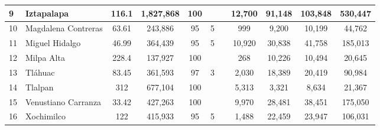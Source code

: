\begin{landscape}
\begin{table}[]
{\begin{tabular}{llcccllcccc}
\multicolumn{1}{|l|}{9} & \multicolumn{1}{l|}{Iztapalapa} & \multicolumn{1}{c|}{116.1} & \multicolumn{1}{c|}{1,827,868} & \multicolumn{1}{c|}{100} & \multicolumn{1}{l|}{} & \multicolumn{1}{l|}{} & \multicolumn{1}{c|}{12,700} & \multicolumn{1}{c|}{91,148} & \multicolumn{1}{c|}{103,848} & \multicolumn{1}{c|}{530,447} \\ \hline
\multicolumn{1}{|l|}{10} & \multicolumn{1}{l|}{Magdalena Contreras} & \multicolumn{1}{c|}{63.61} & \multicolumn{1}{c|}{243,886} & \multicolumn{1}{c|}{95} & \multicolumn{1}{c|}{5} & \multicolumn{1}{l|}{} & \multicolumn{1}{c|}{999} & \multicolumn{1}{c|}{9,200} & \multicolumn{1}{c|}{10,199} & \multicolumn{1}{c|}{44,762} \\ \hline
\multicolumn{1}{|l|}{11} & \multicolumn{1}{l|}{Miguel Hidalgo} & \multicolumn{1}{c|}{46.99} & \multicolumn{1}{c|}{364,439} & \multicolumn{1}{c|}{95} & \multicolumn{1}{c|}{5} & \multicolumn{1}{l|}{} & \multicolumn{1}{c|}{10,920} & \multicolumn{1}{c|}{30,838} & \multicolumn{1}{c|}{41,758} & \multicolumn{1}{c|}{185,013} \\ \hline
\multicolumn{1}{|l|}{12} & \multicolumn{1}{l|}{Milpa Alta} & \multicolumn{1}{c|}{228.4} & \multicolumn{1}{c|}{137,927} & \multicolumn{1}{c|}{100} & \multicolumn{1}{l|}{} & \multicolumn{1}{l|}{} & \multicolumn{1}{c|}{268} & \multicolumn{1}{c|}{10,226} & \multicolumn{1}{c|}{10,494} & \multicolumn{1}{c|}{20,645} \\ \hline
\multicolumn{1}{|l|}{13} & \multicolumn{1}{l|}{Tláhuac} & \multicolumn{1}{c|}{83.45} & \multicolumn{1}{c|}{361,593} & \multicolumn{1}{c|}{97} & \multicolumn{1}{c|}{3} & \multicolumn{1}{l|}{} & \multicolumn{1}{c|}{2,030} & \multicolumn{1}{c|}{18,389} & \multicolumn{1}{c|}{20,419} & \multicolumn{1}{c|}{90,984} \\ \hline
\multicolumn{1}{|l|}{14} & \multicolumn{1}{l|}{Tlalpan} & \multicolumn{1}{c|}{312} & \multicolumn{1}{c|}{677,104} & \multicolumn{1}{c|}{100} & \multicolumn{1}{l|}{} & \multicolumn{1}{l|}{} & \multicolumn{1}{c|}{5,313} & \multicolumn{1}{c|}{3,321} & \multicolumn{1}{c|}{8,634} & \multicolumn{1}{c|}{21,367} \\ \hline
\multicolumn{1}{|l|}{15} & \multicolumn{1}{l|}{Venustiano Carranza} & \multicolumn{1}{c|}{33.42} & \multicolumn{1}{c|}{427,263} & \multicolumn{1}{c|}{100} & \multicolumn{1}{l|}{} & \multicolumn{1}{l|}{} & \multicolumn{1}{c|}{9,970} & \multicolumn{1}{c|}{28,481} & \multicolumn{1}{c|}{38,451} & \multicolumn{1}{c|}{175,050} \\ \hline
\multicolumn{1}{|l|}{16} & \multicolumn{1}{l|}{Xochimilco} & \multicolumn{1}{c|}{122} & \multicolumn{1}{c|}{415,933} & \multicolumn{1}{c|}{95} & \multicolumn{1}{c|}{5} & \multicolumn{1}{l|}{} & \multicolumn{1}{c|}{1,488} & \multicolumn{1}{c|}{22,459} & \multicolumn{1}{c|}{23,947} & \multicolumn{1}{c|}{106,031} \\ \hline

\end{tabular}}
\end{table}
\end{landscape}
